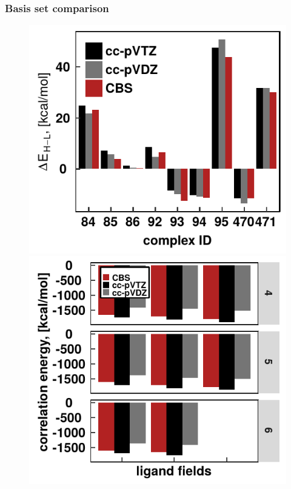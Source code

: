 \documentclass[xcolor=dvipsnames]{beamer}
\begin{document}
\begin{frame}
\frametitle{Basis set comparison}
\begin{figure}[ht]  
	\begin{minipage}[b]{0.5\linewidth}
		\centering
		\includegraphics[width=.8\linewidth]{img/splitAllcomp.pdf} 
	\end{minipage}%
	\begin{minipage}[b]{0.5\linewidth}
		\centering
		\includegraphics[width=.8\linewidth]{img/corrVsBasis-CBS-high-spin.pdf} 
	\end{minipage} 
\end{figure}

\end{frame}
\end{document}
